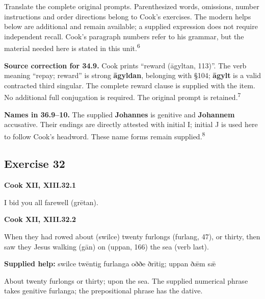 Translate the complete original prompts. Parenthesized words, omissions, number instructions and order directions belong to Cook’s exercises. The modern helps below are additional and remain available; a supplied expression does not require independent recall. Cook’s paragraph numbers refer to his grammar, but the material needed here is stated in this unit.\textsuperscript{6}

\textbf{Source correction for 34.9.} Cook prints “reward (āgyltan, 113)”. The verb meaning “repay; reward” is strong \textbf{āgyldan}, belonging with §104; \textbf{āgylt} is a valid contracted third singular. The complete reward clause is supplied with the item. No additional full conjugation is required. The original prompt is retained.\textsuperscript{7}

\textbf{Names in 36.9–10.} The supplied \textbf{Johannes} is genitive and \textbf{Johannem} accusative. Their endings are directly attested with initial I; initial J is used here to follow Cook’s headword. These name forms remain supplied.\textsuperscript{8}

\subsection*{Exercise 32}

\par\begin{minipage}{\linewidth}\raggedright
\textbf{Cook XII, XIII.32.1}

I bid you all farewell (grētan).

\end{minipage}\par\addvspace{4pt}

\par\begin{minipage}{\linewidth}\raggedright
\textbf{Cook XII, XIII.32.2}

When they had rowed about (swilce) twenty furlongs (furlang, 47), or thirty, then saw they Jesus walking (gān) on (uppan, 166) the sea (verb last).

\textbf{Supplied help:} swilce twēntig furlanga oððe ðrītig; uppan ðǣm sǣ

About twenty furlongs or thirty; upon the sea. The supplied numerical phrase takes genitive furlanga; the prepositional phrase has the dative.

\end{minipage}\par\addvspace{4pt}

